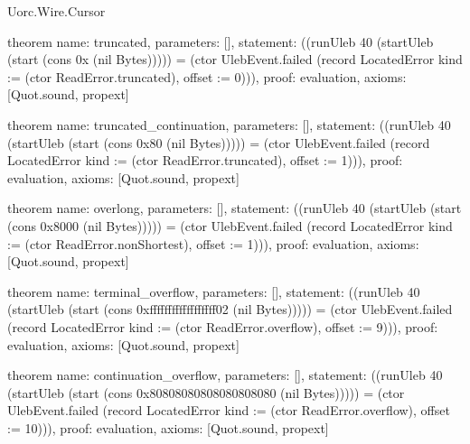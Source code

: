 \begin{lexlean}{Uorc.Wire.Cursor}
\begin{semanticmodule}
theorem{
  name: truncated,
  parameters: [],
  statement: ((runUleb 40 (startUleb (start (cons 0x (nil Bytes))))) = (ctor UlebEvent.failed (record LocatedError {kind := (ctor ReadError.truncated), offset := 0}))),
  proof: evaluation{},
  axioms: [Quot.sound, propext]
}

theorem{
  name: truncated_continuation,
  parameters: [],
  statement: ((runUleb 40 (startUleb (start (cons 0x80 (nil Bytes))))) = (ctor UlebEvent.failed (record LocatedError {kind := (ctor ReadError.truncated), offset := 1}))),
  proof: evaluation{},
  axioms: [Quot.sound, propext]
}

theorem{
  name: overlong,
  parameters: [],
  statement: ((runUleb 40 (startUleb (start (cons 0x8000 (nil Bytes))))) = (ctor UlebEvent.failed (record LocatedError {kind := (ctor ReadError.nonShortest), offset := 1}))),
  proof: evaluation{},
  axioms: [Quot.sound, propext]
}

theorem{
  name: terminal_overflow,
  parameters: [],
  statement: ((runUleb 40 (startUleb (start (cons 0xffffffffffffffffff02 (nil Bytes))))) = (ctor UlebEvent.failed (record LocatedError {kind := (ctor ReadError.overflow), offset := 9}))),
  proof: evaluation{},
  axioms: [Quot.sound, propext]
}

theorem{
  name: continuation_overflow,
  parameters: [],
  statement: ((runUleb 40 (startUleb (start (cons 0x80808080808080808080 (nil Bytes))))) = (ctor UlebEvent.failed (record LocatedError {kind := (ctor ReadError.overflow), offset := 10}))),
  proof: evaluation{},
  axioms: [Quot.sound, propext]
}
\end{semanticmodule}
\end{lexlean}
